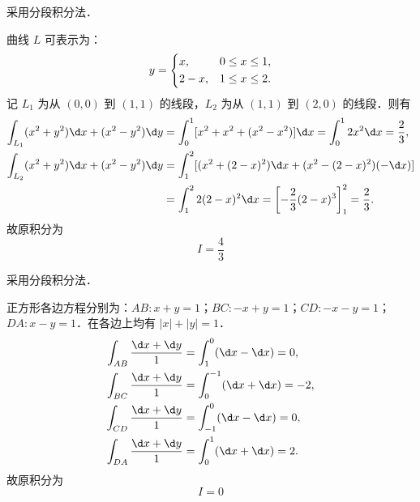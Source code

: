 \begin{solution}
    采用分段积分法．

    曲线 $L$ 可表示为：
    \begin{equation}
        y = \begin{dcases} x, & 0 \le x \le 1, \\ 2 - x, & 1 \le x \le 2. \end{dcases}
    \end{equation}
    记 $L_1$ 为从 $(0,0)$ 到 $(1,1)$ 的线段，$L_2$ 为从 $(1,1)$ 到 $(2,0)$ 的线段．则有
    \begin{equation}
        \begin{aligned}
            \int_{L_1} (x^2 + y^2) \d x + (x^2 - y^2) \d y & = \int_0^1 [x^2 + x^2 + (x^2 - x^2)] \d x = \int_0^1 2x^2 \d x = \frac{2}{3},    \\
            \int_{L_2} (x^2 + y^2) \d x + (x^2 - y^2) \d y & = \int_1^2 [(x^2 + (2-x)^2) \d x + (x^2 - (2-x)^2) (-\d x)]                      \\
                                                           & = \int_1^2 2(2-x)^2 \d x = \left[ -\frac{2}{3}(2-x)^3 \right]_1^2 = \frac{2}{3}.
        \end{aligned}
    \end{equation}
    故原积分为
    \begin{equation}
        I = \boxed{\frac{4}{3}}
    \end{equation}

    采用分段积分法．

    正方形各边方程分别为：$AB: x+y=1$；$BC: -x+y=1$；$CD: -x-y=1$；$DA: x-y=1$．在各边上均有 $|x|+|y|=1$．
    \begin{equation}
        \begin{aligned}
            \int_{AB} \frac{\d x + \d y}{1} & = \int_1^0 (\d x - \d x) = 0,     \\
            \int_{BC} \frac{\d x + \d y}{1} & = \int_0^{-1} (\d x + \d x) = -2, \\
            \int_{CD} \frac{\d x + \d y}{1} & = \int_{-1}^0 (\d x - \d x) = 0,  \\
            \int_{DA} \frac{\d x + \d y}{1} & = \int_0^1 (\d x + \d x) = 2.
        \end{aligned}
    \end{equation}
    故原积分为
    \begin{equation}
        I = \boxed{0}
    \end{equation}


\end{solution}
